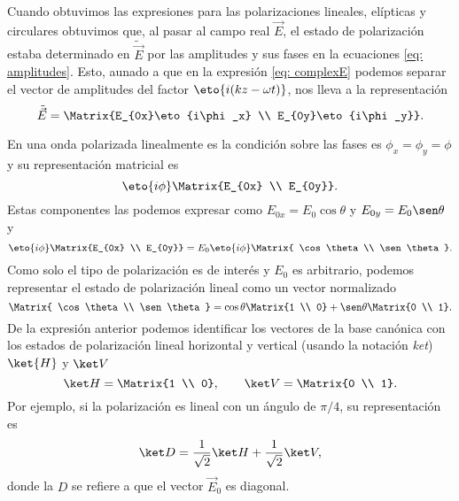 Cuando obtuvimos las expresiones para las polarizaciones lineales, elípticas y circulares obtuvimos que, al pasar al campo real $\vec E$, el estado de polarización estaba determinado en $\tilde{\vec E}$ por las amplitudes y sus fases en la ecuaciones \eqref{eq: amplitudes}. Esto, aunado a que en la expresión \eqref{eq: complexE} podemos separar el vector de amplitudes del factor $\eto{i(kz-\omega t)}$, nos lleva a la representación
\begin{equation}\label{eq: MatrixE}
    \tilde{\vec E} = \Matrix{E_{0x}\eto{i\phi_x} \\ E_{0y}\eto{i\phi_y}}.
\end{equation}

En una onda polarizada linealmente es la condición sobre las fases es $\phi_x = \phi_y = \phi$ y su representación matricial es
\begin{equation}
    \eto{i\phi} \Matrix{E_{0x} \\ E_{0y}}.
\end{equation}
Estas componentes las podemos expresar como $E_{0x} = E_0 \cos \theta$ y $E_{0y} = E_0 \sen \theta$ y
\begin{equation}
     \eto{i\phi} \Matrix{E_{0x} \\ E_{0y}} =  E_0\eto{i\phi} \Matrix{ \cos\theta \\ \sen \theta}.
\end{equation}
Como solo el tipo de polarización es de interés y $E_0$ es arbitrario, podemos representar el estado de polarización lineal como
un vector normalizado
\begin{equation}
      \Matrix{ \cos\theta \\ \sen \theta} = \cos\theta\Matrix{1 \\ 0} + \sen\theta\Matrix{0 \\ 1}.
\end{equation}
De la expresión anterior podemos identificar los vectores de la base canónica con los estados de polarización lineal horizontal y vertical (usando la notación \emph{ket}) $\ket{H}$ y $\ket V$
\begin{equation}
    \ket H = \Matrix{1 \\ 0}, \qquad \ket V = \Matrix{0 \\ 1}.
\end{equation}
Por ejemplo, si la polarización es lineal con un ángulo de $\pi/4$, su representación es
\begin{equation}
    \ket D = \frac{1}{\sqrt 2}\ket H + \frac{1}{\sqrt 2}\ket V,
\end{equation}
donde la $D$ se refiere a que el vector $\vec E_0$ es diagonal.


